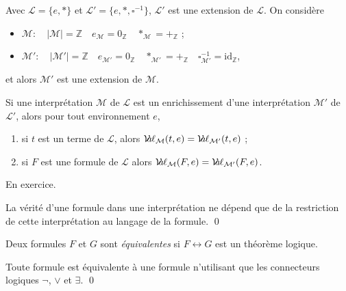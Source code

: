 \documentclass[./main]{subfiles}
\begin{document}
  \begin{exm}
    Avec $\mathcal{L} = \{e, *\}$ et $\mathcal{L}' = \{e, *, \square^{-1}\}$, $\mathcal{L}'$ est une extension de $\mathcal{L}$.
    On considère 
    \begin{itemize}
      \item $\mathcal{M} : \quad |\mathcal{M}| = \mathds{Z} \quad e_{\mathcal{M}} = 0_\mathds{Z} \quad *_{\mathcal{M}} = +_\mathds{Z}$ ;
      \item $\mathcal{M}' : \quad |\mathcal{M}'| = \mathds{Z} \quad e_{\mathcal{M'}} = 0_\mathds{Z} \quad *_{\mathcal{M'}} = +_\mathds{Z} \quad \square^{-1}_{\mathcal{M'}} = \mathrm{id}_\mathds{Z}$,
    \end{itemize}
    et alors $\mathcal{M}'$ est une extension de $\mathcal{M}$.
  \end{exm}

  \begin{prop}
    Si une interprétation $\mathcal{M}$ de $\mathcal{L}$ est un enrichissement d'une interprétation $\mathcal{M}'$ de $\mathcal{L}'$, alors pour tout environnement $e$, 
    \begin{enumerate}
      \item si $t$ est un terme de $\mathcal{L}$, alors $\mathcal{V}\hspace{-3.5pt}a\hspace{-0.5pt}\ell_{\mathcal{M}}(t, e) = \mathcal{V}\hspace{-3.5pt}a\hspace{-0.5pt}\ell_{\mathcal{M}'}(t, e)$ ;
      \item si $F$ est une formule de $\mathcal{L}$ alors $\mathcal{V}\hspace{-3.5pt}a\hspace{-0.5pt}\ell_{\mathcal{M}}(F, e) = \mathcal{V}\hspace{-3.5pt}a\hspace{-0.5pt}\ell_{\mathcal{M'}}(F, e)$.
    \end{enumerate}
  \end{prop}
  \begin{prv}
    En exercice.
  \end{prv}

  \begin{crlr}
    La vérité d'une formule dans une interprétation ne dépend que de la restriction de cette interprétation au langage de la formule.
    \qed
  \end{crlr}

  \begin{defn}
    Deux formules $F$ et $G$ sont \textit{équivalentes} si $F \leftrightarrow G$ est un théorème logique.
  \end{defn}

  \begin{prop}
    Toute formule est équivalente à une formule n'utilisant que les connecteurs logiques $\lnot$, $\lor$ et $\exists$.
    \qed
  \end{prop}
\end{document}
